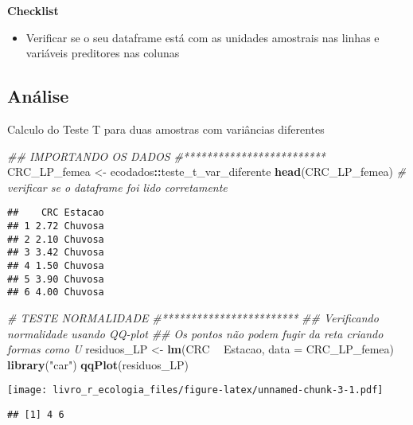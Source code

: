 \documentclass[
]{book}
\newenvironment{Shaded}{\begin{snugshade}}{\end{snugshade}}
\newcommand{\CommentTok}[1]{\textcolor[rgb]{0.56,0.35,0.01}{\textit{#1}}}
\newcommand{\DataTypeTok}[1]{\textcolor[rgb]{0.13,0.29,0.53}{#1}}
\newcommand{\KeywordTok}[1]{\textcolor[rgb]{0.13,0.29,0.53}{\textbf{#1}}}
\newcommand{\NormalTok}[1]{#1}
\newcommand{\OperatorTok}[1]{\textcolor[rgb]{0.81,0.36,0.00}{\textbf{#1}}}
\newcommand{\StringTok}[1]{\textcolor[rgb]{0.31,0.60,0.02}{#1}}
\providecommand{\tightlist}{%
  \setlength{\itemsep}{0pt}\setlength{\parskip}{0pt}}
\begin{document}
\textbf{Checklist}

\begin{itemize}
\tightlist
\item
  Verificar se o seu dataframe está com as unidades amostrais nas linhas e variáveis preditores nas colunas
\end{itemize}

\hypertarget{anuxe1lise-1}{%
\subsection{Análise}\label{anuxe1lise-1}}

Calculo do Teste T para duas amostras com variâncias diferentes

\begin{Shaded}
\begin{Highlighting}[]
\CommentTok{## IMPORTANDO OS DADOS}
\CommentTok{#*************************}
\NormalTok{CRC_LP_femea <-}\StringTok{ }\NormalTok{ecodados}\OperatorTok{::}\NormalTok{teste_t_var_diferente}
\KeywordTok{head}\NormalTok{(CRC_LP_femea) }\CommentTok{# verificar se o dataframe foi lido corretamente}
\end{Highlighting}
\end{Shaded}

\begin{verbatim}
##    CRC Estacao
## 1 2.72 Chuvosa
## 2 2.10 Chuvosa
## 3 3.42 Chuvosa
## 4 1.50 Chuvosa
## 5 3.90 Chuvosa
## 6 4.00 Chuvosa
\end{verbatim}

\begin{Shaded}
\begin{Highlighting}[]
\CommentTok{# TESTE NORMALIDADE}
\CommentTok{#************************}
\CommentTok{## Verificando normalidade usando QQ-plot}
\CommentTok{## Os pontos não podem fugir da reta criando formas como U}
\NormalTok{residuos_LP <-}\StringTok{ }\KeywordTok{lm}\NormalTok{(CRC }\OperatorTok{~}\StringTok{ }\NormalTok{Estacao, }\DataTypeTok{data =}\NormalTok{ CRC_LP_femea)}
\KeywordTok{library}\NormalTok{(}\StringTok{"car"}\NormalTok{)}
\KeywordTok{qqPlot}\NormalTok{(residuos_LP)}
\end{Highlighting}
\end{Shaded}

\texttt{[image: livro\_r\_ecologia\_files/figure-latex/unnamed-chunk-3-1.pdf]}

\begin{verbatim}
## [1] 4 6
\end{verbatim}
\end{document}
